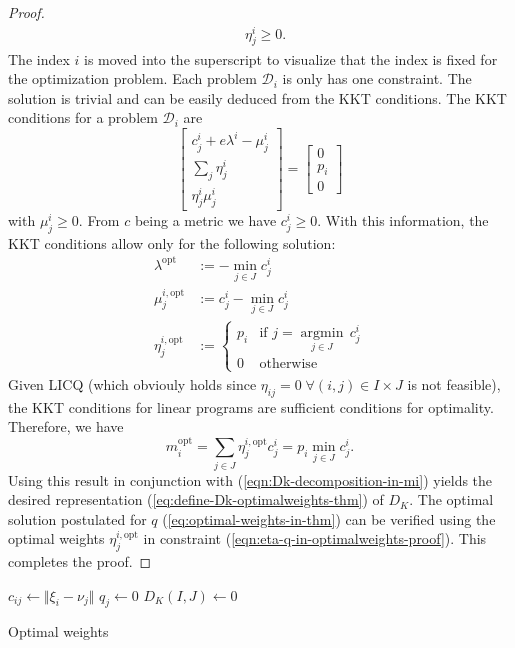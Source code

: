 \begin{proof}
\begin{align}
  &\eta_j^i\geq 0.
\end{align}
The index $i$ is moved into the superscript to visualize that the index is fixed for the optimization problem.
Each problem $\mathcal{D}_i$ is only has one constraint. The solution is trivial and can be easily deduced from the KKT conditions. The KKT conditions for a problem $\mathcal{D}_i$ are
\begin{equation}
  \label{eq:D-i-KKT-in-optimalweightsproof}
  \left[
  \begin{array}{c}
  c_j^i + e\lambda^i -\mu_j^i\\
  \sum_{j}\eta_j^i\\
  \eta_j^i\mu_j^i
  \end{array}
  \right]
  = \left[
    \begin{array}{c}
      0\\p_i\\0
    \end{array}
\right]
\end{equation}
with $\mu_j^i\geq 0$. From $c$ being a metric we have $c_j^i\geq 0$. With this information, the KKT conditions allow only for the following solution:
\begin{align}
  \label{eq:optimal-eta-optmimalweightsproof}
  \lambda^{\mathrm{opt}} &:= -\min\limits_{j\in J}c_j^i\\
  \mu_j^{i,\mathrm{opt}} &:= c_j^i - \min\limits_{j\in J}c_j^i\\
  \eta_j^{i,\mathrm{opt}} &:= \left\{ \begin{array}{lr}p_i&\text{if }j=\underset{j\in J}{\operatorname{argmin}}\, c_j^i\\0&\text{otherwise}\end{array}\right.
\end{align}
Given LICQ (which obviouly holds since $\eta_{ij}=0\;\forall (i,j)\in I\times J$ is not feasible), the KKT conditions for linear programs are sufficient conditions for optimality. Therefore, we have 
\begin{equation}
  m_i^{\mathrm{opt}} = \sum_{j\in J}\eta_j^{i,\mathrm{opt}}c_j^i = p_i\min\limits_{j\in J}c_j^i.
\end{equation}
Using this result in conjunction with (\ref{eqn:Dk-decomposition-in-mi}) yields the desired representation (\ref{eq:define-Dk-optimalweights-thm}) of $D_K$.
The optimal solution postulated for $q$ (\ref{eq:optimal-weights-in-thm}) can be verified using the optimal weights $\eta_j^{i,\mathrm{opt}}$ in constraint (\ref{eqn:eta-q-in-optimalweights-proof}).
This completes the proof.
\end{proof}
\begin{algorithm}
  $c_{ij} \leftarrow \Vert \xi_i - \nu_j\Vert$
  $q_j \leftarrow 0$\;
  $D_K(I,J) \leftarrow 0$\;
  \caption{Optimal weights}
  \label{alg:optimal-weights}
\end{algorithm}
